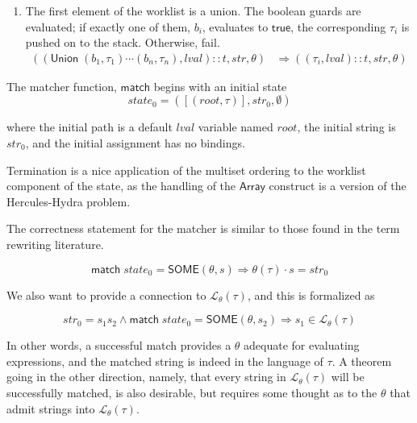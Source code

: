 \documentclass[sigplan,10pt,anonymous,review]{acmart}\settopmatter{printfolios=true,printccs=false,printacmref=false}
\newcommand{\konst}[1]{\ensuremath{\mathsf{#1}}}
\newcommand{\imp}{\Rightarrow}
\newcommand{\lval}{\ensuremath{\mathit{lval}}}
\newcommand{\LangTheta}[1]{\ensuremath{{\mathcal L}_{\theta}({#1})}}
\begin{document}
\begin{definition}
\begin{enumerate}
\item The first element of the worklist is a union. The boolean guards
  are evaluated; if exactly one of them, $b_i$, evaluates to \konst{true}, the
  corresponding $\tau_i$ is pushed on to the stack. Otherwise, fail.
%
\begin{align*}
((\konst{Union}\; (b_1,\tau_1) \cdots (b_n,\tau_n), \lval)::t, \mathit{str}, \theta)
   &\Rightarrow
  ((\tau_i,\lval)::t,\mathit{str}, \theta)
\end{align*}

\end{enumerate}

\noindent The matcher function, \konst{match} begins with an initial state
%
\[
  \mathit{state}_0 = ([(\mathit{root},\tau)],\mathit{str}_0,\emptyset)
\]

where the initial path is a default \lval{} variable named
$\mathit{root}$, the initial string is $\mathit{str}_0$, and the
initial assignment has no bindings.

\end{definition}

\begin{theorem}
Termination is a nice application of the multiset ordering to the
worklist component of the state, as the handling of the \konst{Array}
construct is a version of the Hercules-Hydra problem.
\end{theorem}

The correctness statement for the matcher is similar to those found in
the term rewriting literature.

\begin{theorem}

\[
  \konst{match}\; \mathit{state}_0 = \konst{SOME}(\theta, s)
  \imp \theta(\tau) \cdot s = \mathit{str}_0
\]

\noindent We also want to provide a connection to $\LangTheta{\tau}$,
and this is formalized as

\[
  \mathit{str}_0 = s_1 s_2 \land \konst{match}\; \mathit{state}_0 =
  \konst{SOME}(\theta, s_2) \imp s_1 \in \LangTheta{\tau}
\]

In other words, a successful match provides a $\theta$ adequate for
evaluating expressions, and the matched string is indeed in the
language of $\tau$. A theorem going in the other direction, namely,
that every string in $\LangTheta{\tau}$ will be successfully
matched, is also desirable, but requires some thought as to the
$\theta$ that admit strings into $\LangTheta{\tau}$.

\end{theorem}
\end{document}
